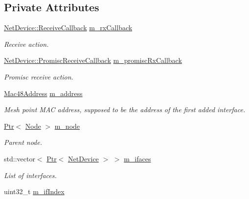 \subsection*{Private Attributes}
\begin{DoxyCompactItemize}
\item 
\hyperlink{classns3_1_1NetDevice_ad5e5e1ca187472bc2ba99575d8def568}{Net\+Device\+::\+Receive\+Callback} \hyperlink{classns3_1_1MeshPointDevice_a7655ae549d9f2faf860b4051259c6509}{m\+\_\+rx\+Callback}
\begin{DoxyCompactList}\small\item\em Receive action. \end{DoxyCompactList}\item 
\hyperlink{classns3_1_1NetDevice_a427225795919f26c414bee2ea3f31ed2}{Net\+Device\+::\+Promisc\+Receive\+Callback} \hyperlink{classns3_1_1MeshPointDevice_a9d8b17d5fc37167fea51c64d21c4f7eb}{m\+\_\+promisc\+Rx\+Callback}
\begin{DoxyCompactList}\small\item\em Promisc receive action. \end{DoxyCompactList}\item 
\hyperlink{classns3_1_1Mac48Address}{Mac48\+Address} \hyperlink{classns3_1_1MeshPointDevice_abdd42cdf967d3b75cc32e20f74e10c51}{m\+\_\+address}
\begin{DoxyCompactList}\small\item\em Mesh point M\+AC address, supposed to be the address of the first added interface. \end{DoxyCompactList}\item 
\hyperlink{classns3_1_1Ptr}{Ptr}$<$ \hyperlink{classns3_1_1Node}{Node} $>$ \hyperlink{classns3_1_1MeshPointDevice_a2da4f2175aa00207f0acd0712f815796}{m\+\_\+node}
\begin{DoxyCompactList}\small\item\em Parent node. \end{DoxyCompactList}\item 
std\+::vector$<$ \hyperlink{classns3_1_1Ptr}{Ptr}$<$ \hyperlink{classns3_1_1NetDevice}{Net\+Device} $>$ $>$ \hyperlink{classns3_1_1MeshPointDevice_a651ebd5660f380c261cd9a055a95805d}{m\+\_\+ifaces}
\begin{DoxyCompactList}\small\item\em List of interfaces. \end{DoxyCompactList}\item 
uint32\+\_\+t \hyperlink{classns3_1_1MeshPointDevice_a0d5bbbd2c3930407c50757ba70ef71a7}{m\+\_\+if\+Index}

\end{DoxyCompactItemize}
